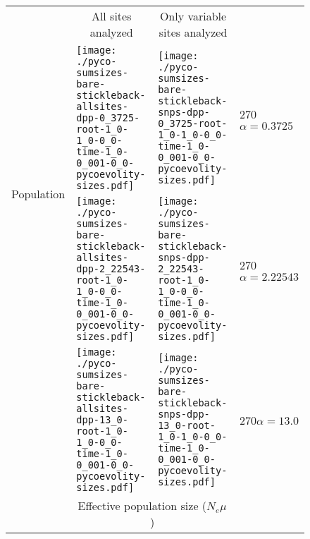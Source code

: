 \documentclass[border=10pt,varwidth=30cm]{standalone}
\begin{document}
\begin{figure}
    \centering
    \begin{tabular}{@{}llll@{}}
        & \multicolumn{1}{c}{All sites analyzed} & \multicolumn{1}{c}{Only variable sites analyzed} & \\
        \multirow{2}{*}[2em]{\begin{sideways}\large Population\end{sideways}}
        & \texttt{[image: ./pyco-sumsizes-bare-stickleback-allsites-dpp-0\_3725-root-1\_0-1\_0-0\_0-time-1\_0-0\_001-0\_0-pycoevolity-sizes.pdf]}
        & \texttt{[image: ./pyco-sumsizes-bare-stickleback-snps-dpp-0\_3725-root-1\_0-1\_0-0\_0-time-1\_0-0\_001-0\_0-pycoevolity-sizes.pdf]}
        & \multirow{1}{*}[11.5em]{\begin{rotate}{270}$\alpha = 0.3725$\end{rotate}} \\
        & \texttt{[image: ./pyco-sumsizes-bare-stickleback-allsites-dpp-2\_22543-root-1\_0-1\_0-0\_0-time-1\_0-0\_001-0\_0-pycoevolity-sizes.pdf]}
        & \texttt{[image: ./pyco-sumsizes-bare-stickleback-snps-dpp-2\_22543-root-1\_0-1\_0-0\_0-time-1\_0-0\_001-0\_0-pycoevolity-sizes.pdf]}
        & \multirow{1}{*}[11.5em]{\begin{rotate}{270}$\alpha = 2.22543$\end{rotate}} \\
        & \texttt{[image: ./pyco-sumsizes-bare-stickleback-allsites-dpp-13\_0-root-1\_0-1\_0-0\_0-time-1\_0-0\_001-0\_0-pycoevolity-sizes.pdf]}
        & \texttt{[image: ./pyco-sumsizes-bare-stickleback-snps-dpp-13\_0-root-1\_0-1\_0-0\_0-time-1\_0-0\_001-0\_0-pycoevolity-sizes.pdf]}
        & \multirow{1}{*}[11.5em]{\begin{rotate}{270}$\alpha = 13.0$\end{rotate}} \\
        & \multicolumn{2}{c}{\large Effective population size ($N_e\mu$)} & 
    \end{tabular}
\end{figure}
\end{document}
